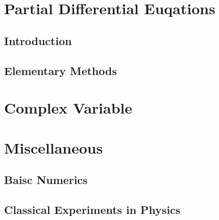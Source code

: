 \documentclass[a4paper,11pt,oneside]{book}
\begin{document}




\section{Partial Differential Euqations}

\subsection{Introduction}



\subsection{Elementary Methods}







\section{Complex Variable}





\section{Miscellaneous}

\subsection{Baisc Numerics}



\subsection{Classical Experiments in Physics}


\end{document}
